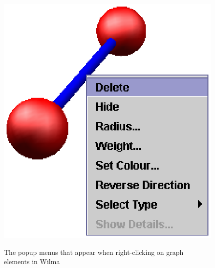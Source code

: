 \documentclass[runningheads]{cl2emult}
\begin{document}
\begin{figure}
{{    \includegraphics{figures/edgemenu.eps}}}
  \caption{The popup menus that appear when right-clicking on graph
  elements in Wilma}
\end{figure}
\end{document}
